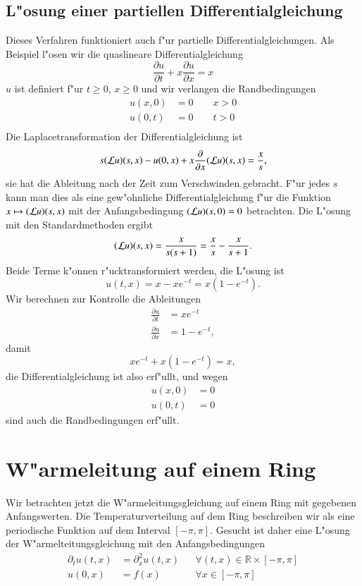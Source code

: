 \subsection{L"osung einer partiellen Differentialgleichung}
Dieses Verfahren funktioniert auch f"ur partielle Differentialgleichungen.
Als Beispiel l"osen wir die quaslineare Differentialgleichung
$$
\frac{\partial u}{\partial t}+x\frac{\partial u}{\partial x}=x
$$
$u$ ist definiert f"ur $t\ge0$, $x\ge 0$ und wir verlangen die Randbedingungen
\begin{align*}
u(x,0)&=0\qquad x>0\\
u(0,t)&=0\qquad t>0\\
\end{align*}
Die Laplacetransformation der Differentialgleichung ist
$$
s({\cal L}u)(s,x)-u(0,x)+x\frac{\partial}{\partial x}({\cal L}u)(s,x)=\frac{x}{s},
$$
sie hat die Ableitung nach der Zeit zum Verschwinden gebracht. F"ur jedes
$s$ kann man dies als eine gew"ohnliche Differentialgleichung f"ur die
Funktion $x\mapsto ({\cal L}u)(s,x)$ mit der Anfangsbedingung
$({\cal L}u)(s,0)=0$ betrachten.
Die L"osung mit den Standardmethoden 
ergibt
$$
({\cal L}u)(s,x)=\frac{x}{s(s+1)}=\frac{x}{s}-\frac{x}{s+1}.
$$
Beide Terme k"onnen r"ucktransformiert werden, die L"osung ist
$$
u(t,x)=x-xe^{-t}=x(1-e^{-t}).
$$
Wir berechnen zur Kontrolle die Ableitungen
\begin{align*}
\frac{\partial u}{\partial t}
&=
xe^{-t}
\\
\frac{\partial u}{\partial x}
&=
1-e^{-t},
\end{align*}
damit 
$$
xe^{-t}+x(1-e^{-t})=x,
$$
die Differentialgleichung ist also erf"ullt, und wegen
\begin{align*}
u(x,0)
&=
0
\\
u(0,t)
&=
0
\end{align*}
sind auch die Randbedingungen erf"ullt.

\section{W"armeleitung auf einem Ring}
Wir betrachten jetzt die W"armeleitungsgleichung auf einem Ring
mit gegebenen Anfangswerten. Die Temperaturverteilung auf dem
Ring beschreiben wir als eine periodische Funktion auf dem Interval
$[-\pi,\pi]$. Gesucht ist daher eine L"osung der W"armelteitungsgleichung
mit den Anfangsbedingungen
\begin{align*}
\partial_t u(t,x)&=\partial_x^2 u(t,x) &&\forall(t,x)\in\mathbb R\times[-\pi,\pi]\\
u(0,x)&=f(x)&& \forall x\in[-\pi,\pi]\\
\end{align*}

